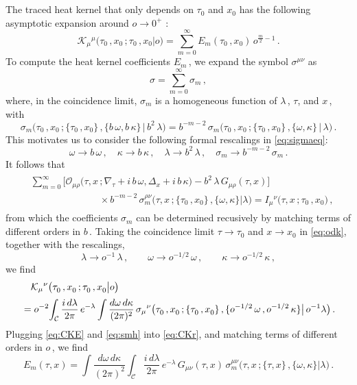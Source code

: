 \documentclass[11pt]{article}
\newcommand{\be}{\begin{equation}}
\newcommand{\ee}{\end{equation}}
\newcommand{\CC}{\mathcal{C}}
\newcommand{\CK}{\mathcal{K}}
\newcommand{\CO}{\mathcal{O}}
\begin{document}
The traced heat kernel that only depends on $\tau^{}_0$ and $x^{}_0$ has the following asymptotic expansion around $o \rightarrow 0^+$ \cite{seeley1967complex}:
%
\be \label{eq:CKE}
	\CK_\mu{}^\mu \bigl(\tau_0\,, x_0\,; \tau_0\,, x_0 \big| o \bigr) = \sum_{m=0}^\infty E_m (\tau_0\,, x_0) \, o^{\frac{m}{2}-1}\,.
\ee
%
To compute the heat kernel coefficients $E_m$\,, we expand the symbol $\sigma^{\mu\nu}$ as
%
\be
	\sigma = \sum_{m=0}^\infty \sigma_m\,,
\ee
%
where, in the coincidence limit, $\sigma_m$ is a homogeneous function of $\lambda$\,, $\tau$, and $x$\,, with
%
\be \label{eq:smh}
	\sigma_m \bigl( \tau_0\,, x_0\,; \{\tau_0\,, x_0\}\,, \{ b \, \omega, b \, \kappa \} \, \big| \, b^2 \, \lambda \bigr) = b^{-m-2} \, \sigma_m \bigl( \tau_0\,, x_0\,; \{\tau_0\,, x_0\}\,, \{ \omega, \kappa \} \, \big| \, \lambda \bigr)\,.
\ee
%
This motivates us to consider the following formal rescalings in \eqref{eq:sigmaeq}:
%
\be
	\omega \rightarrow b \, \omega\,,
		\quad
	\kappa \rightarrow b \, \kappa\,,
		\quad
	\lambda \rightarrow b^2 \, \lambda\,,
		\quad
	\sigma_m \rightarrow b^{-m-2} \, \sigma_m\,.
\ee
%
It follows that
%
\begin{align} \label{eq:prerecursion}
\begin{split}
	& \sum_{m=0}^\infty \bigl[ \CO_{\mu\rho} \bigl( \tau, x\,; \nabla_{\!\tau} + i \, b \, \omega, \Delta_x + i \, b \, \kappa \bigr) - b^2 \, \lambda \, G_{\mu\rho} (\tau, x) \bigr] \\[2pt]
	& \hspace{3cm} \times b^{-m-2} \, \sigma_m^{\rho\nu} \bigl(\tau, x\,; \{ \tau_0\,, x_0 \}\,, \{\omega, \kappa\} | \lambda\bigr)
	= I_\mu{}^\nu \bigl( \tau, x\,; \tau_0\,, x_0 \bigr)\,,
\end{split}
\end{align}
%
from which the coefficients $\sigma_m$ can be determined recusively by matching terms of different orders in $b$\,.
Taking the coincidence limit $\tau \rightarrow \tau^{}_0$ and $x \rightarrow x^{}_0$ in \eqref{eq:odk}, together with the rescalings,
%
\be
	\lambda \rightarrow o^{-1} \, \lambda\,,
		\qquad
	\omega \rightarrow o^{-1/2} \, \omega\,,
		\qquad
	\kappa \rightarrow o^{-1/2} \, \kappa\,,
\ee
%
we find
%
\begin{align} \label{eq:CKr}
	& \quad \CK_\mu{}^\nu \bigl(\tau^{}_0\,, x^{}_0\,; \tau^{}_0\,, x^{}_0 \big| o \bigr) \notag \\[2pt]
	& = o^{-2} \! \int_\CC \frac{i \, d\lambda}{2\pi} \, e^{-\lambda} \int \frac{d\omega \, d\kappa}{(2\pi)^2} \, \sigma_\mu{}^\nu \bigl(\tau^{}_0\,, x^{}_0\,; \{ \tau^{}_0\,, x^{}_0 \}\,, \{o^{-1/2} \, \omega\,, o^{-1/2} \, \kappa\} \big| \, o^{-1} \lambda\bigr)\,.
\end{align}
%
Plugging \eqref{eq:CKE} and \eqref{eq:smh} into \eqref{eq:CKr}, and matching terms of different orders in $o$\,, we find
%
\be \label{eq:Emsigma2}
	E_m (\tau, x) = \int \frac{d\omega \, d\kappa}{(2\pi)^2} \int_\CC \frac{i \, d\lambda}{2\pi} \, e^{-\lambda} \, G_{\mu\nu} (\tau, x) \, \sigma_m^{\mu\nu} \bigl(\tau, x\,; \{ \tau, x \}\,, \{ \omega, \kappa\} \big| \lambda\bigr)\,.
\ee
\end{document}
